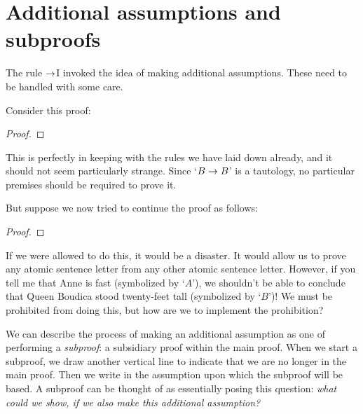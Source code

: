 \section{Additional assumptions and subproofs}
The rule $\rightarrow$I invoked the idea of making additional assumptions. These need to be handled with some care.

Consider this proof:
\begin{proof}
	\open
		 
	\close
\end{proof}
This is perfectly in keeping with the rules we have laid down already, and it should not seem particularly strange. Since `$B \rightarrow B$' is a tautology, no particular premises should be required to prove it. 

But suppose we now tried to continue the proof as follows:
\begin{proof}
	\open
		 
	\close
\end{proof}
If we were allowed to do this, it would be a disaster. It would allow us to prove any atomic sentence letter from any other atomic sentence letter. However, if you tell me that Anne is fast (symbolized by `$A$'), we shouldn't be able to conclude that Queen Boudica stood twenty-feet tall (symbolized by `$B$')! We must be prohibited from doing this, but how are we to implement the prohibition?

We can describe the process of making an additional assumption as one of performing a \emph{subproof}: a subsidiary proof within the main proof. When we start a subproof, we draw another vertical line to indicate that we are no longer in the main proof. Then we write in the assumption upon which the subproof will be based. A subproof can be thought of as essentially posing this question: \emph{what could we show, if we also make this additional assumption?}

